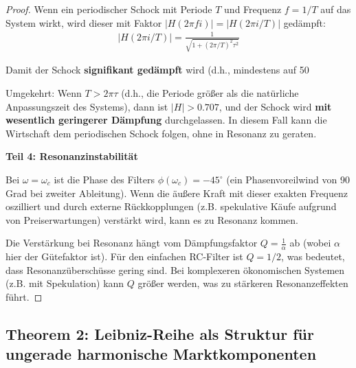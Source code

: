 \documentclass[a4paper,12pt,twoside]{report}
\theoremstyle{definition}
\begin{document}
\begin{proof}
Wenn ein periodischer Schock mit Periode $T$ und Frequenz $f = 1/T$ auf das System wirkt, wird dieser mit Faktor $|H(2\pi f i)| = |H(2\pi i / T)|$ gedämpft:
\begin{align}
|H(2\pi i/T)| = \frac{1}{\sqrt{1 + (2\pi/T)^2\tau^2}}
\end{align}

Damit der Schock \textbf{signifikant gedämpft} wird (d.h., mindestens auf 50%

Umgekehrt: Wenn $T > 2\pi\tau$ (d.h., die Periode größer als die natürliche Anpassungszeit des Systems), dann ist $|H| > 0.707$, und der Schock wird \textbf{mit wesentlich geringerer Dämpfung} durchgelassen. In diesem Fall kann die Wirtschaft dem periodischen Schock folgen, ohne in Resonanz zu geraten.

\textbf{Teil 4: Resonanzinstabilität}

Bei $\omega = \omega_c$ ist die Phase des Filters $\phi(\omega_c) = -45^\circ$ (ein Phasenvoreilwind von 90 Grad bei zweiter Ableitung). Wenn die äußere Kraft mit dieser exakten Frequenz oszilliert und durch externe Rückkopplungen (z.B. spekulative Käufe aufgrund von Preiserwartungen) verstärkt wird, kann es zu Resonanz kommen.

Die Verstärkung bei Resonanz hängt vom Dämpfungsfaktor $Q = \frac{1}{\alpha}$ ab (wobei $\alpha$ hier der Gütefaktor ist). Für den einfachen RC-Filter ist $Q = 1/2$, was bedeutet, dass Resonanzüberschüsse gering sind. Bei komplexeren ökonomischen Systemen (z.B. mit Spekulation) kann $Q$ größer werden, was zu stärkeren Resonanzeffekten führt.

\end{proof}

\subsection*{Theorem 2: Leibniz-Reihe als Struktur für ungerade harmonische Marktkomponenten}
\end{document}
